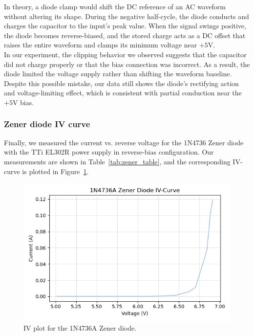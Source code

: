 \documentclass{article}
\begin{document}
\noindent In theory, a diode clamp would shift the DC reference of an AC waveform without
altering its shape. During the negative half-cycle, the diode conducts and charges
the capacitor to the input's peak value. When the signal swings positive, the diode
becomes reverse-biased, and the stored charge acts as a DC offset that raises
the entire waveform and clamps its minimum voltage near $+5\si{\volt}$.\\

\noindent In our experiment, the clipping behavior we observed suggests that
the capacitor did not charge properly or that the bias connection was incorrect.
As a result, the diode limited the voltage supply rather than shifting the
waveform baseline. Despite this possible mistake, our data still shows the
diode's rectifying action and voltage-limiting effect, which is consistent with
partial conduction near the $+5\si{\volt}$ bias.


\subsubsection{Zener diode IV curve}

Finally, we measured the current vs. reverse voltage for the 1N4736 Zener diode
with the TTi EL302R power supply in reverse-bias configuration. Our measurements
are shown in Table~\ref{tab:zener_table}, and the corresponding IV-curve is 
plotted in Figure~\ref{fig:zener}.

\begin{figure}[H]
    \centering
    \includegraphics[width=0.6\linewidth]{4.2eplot.png}
    \caption{IV plot for the 1N4736A Zener diode.}
    \label{fig:zener}
\end{figure}
\end{document}
